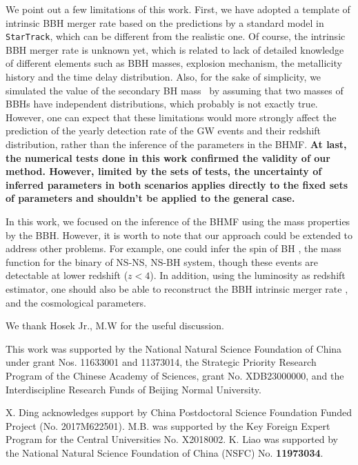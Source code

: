 \documentclass[twocolumn]{aastex62}
\newcommand{\blue}[1]{{\bf #1}}
\begin{document}
We point out a few limitations of this work. First, we have adopted a template of intrinsic BBH merger rate based on the predictions by a standard model in {\tt StarTrack}, which can be different from the realistic one. Of course, the intrinsic BBH merger rate is unknown yet, which is related to 
lack of detailed knowledge of different elements such as BBH masses, explosion mechanism, the metallicity history and the time delay distribution. Also, for the sake of simplicity, we simulated the value of the secondary BH mass \mtwo\ by assuming that two masses of BBHs have independent distributions, which probably is not exactly true. However, one can expect that these limitations would more strongly affect the prediction of the yearly detection rate of the GW events and their redshift distribution, rather than the inference of the parameters in the BHMF.
\blue{At last, the numerical tests done in this work confirmed the validity of our method. However, limited by the sets of tests, the uncertainty of inferred parameters  in both scenarios applies directly to the fixed sets of parameters and shouldn't be applied to the general case.}

In this work, we focused on the inference of the BHMF using the mass properties by the BBH. However, it is worth to note that our approach could be extended to address other problems. For example, one could infer the spin of BH \citep{Abbott2018b}, the mass function for the binary of NS-NS, NS-BH system, though these events are detectable at lower redshift ($z<4$). In addition, using the luminosity as redshift estimator, one should also be able to reconstruct the BBH intrinsic merger rate \citep{Fishbach2018}, and the cosmological parameters.


\acknowledgments
We thank Hosek Jr., M.W for the useful discussion.

This work was supported by the National Natural Science Foundation of China under grant Nos. 11633001 and 11373014, the Strategic Priority Research Program of the Chinese Academy of Sciences, grant No. XDB23000000, and the Interdiscipline Research Funds of Beijing Normal University.

X. Ding acknowledges support by China Postdoctoral Science Foundation Funded Project (No. 2017M622501).
M.B. was supported by the Key Foreign Expert Program for the Central Universities No. X2018002.
K. Liao was supported by the National Natural Science Foundation of China (NSFC) No. {\bf 11973034}.
\end{document}

